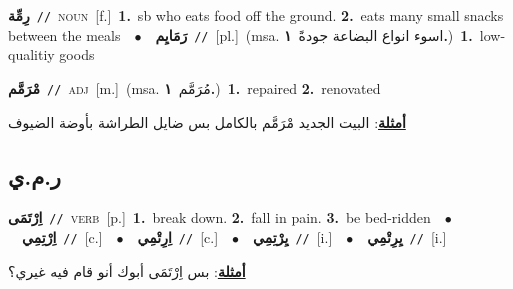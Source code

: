 \documentclass[10pt,a4paper,twoside]{article} %
\begin{document}
\begin{multicols}{2}
{\setlength\topsep{0pt}\textbf{\foreignlanguage{arabic}{رِمِّة}}\ {\color{gray}\texttt{//}\color{black}}\ \textsc{noun}\ [f.]\ \textbf{1.}~sb who eats food off the ground.  \textbf{2.}~eats many small snacks between the meals\ \ $\bullet$\ \ \setlength\topsep{0pt}\textbf{\foreignlanguage{arabic}{رَمَايِم}}\ {\color{gray}\texttt{//}\color{black}}\ [pl.]\ \color{gray}(msa. \foreignlanguage{arabic}{اسوء انواع البضاعة جودةً}~\foreignlanguage{arabic}{\textbf{١.}})\color{black}\ \textbf{1.}~low-qualitiy goods\ } \vspace{2mm}

{\setlength\topsep{0pt}\textbf{\foreignlanguage{arabic}{مْرَمَّم}}\ {\color{gray}\texttt{//}\color{black}}\ \textsc{adj}\ [m.]\ \color{gray}(msa. \foreignlanguage{arabic}{مُرَمَّم}~\foreignlanguage{arabic}{\textbf{١.}})\color{black}\ \textbf{1.}~repaired  \textbf{2.}~renovated\  \begin{flushright}\color{gray}\foreignlanguage{arabic}{\textbf{\underline{\foreignlanguage{arabic}{أمثلة}}}: البيت الجديد مْرَمَّم بالكامل بس ضايل الطراشة بأوضة الضيوف}\end{flushright}\color{black}} \vspace{2mm}

\vspace{-3mm}
\subsection*{\color{blue}\foreignlanguage{arabic}{ر.م.ي}\color{blue}{}} 

{\setlength\topsep{0pt}\textbf{\foreignlanguage{arabic}{اِرْتَمَى}}\ {\color{gray}\texttt{//}\color{black}}\ \textsc{verb}\ [p.]\ \textbf{1.}~break down.  \textbf{2.}~fall in pain.  \textbf{3.}~be bed-ridden\ \ $\bullet$\ \ \setlength\topsep{0pt}\textbf{\foreignlanguage{arabic}{اِرْتِمِي}}\ {\color{gray}\texttt{//}\color{black}}\ [c.]\ \ $\bullet$\ \ \setlength\topsep{0pt}\textbf{\foreignlanguage{arabic}{اِرِتْمِي}}\ {\color{gray}\texttt{//}\color{black}}\ [c.]\ \ $\bullet$\ \ \setlength\topsep{0pt}\textbf{\foreignlanguage{arabic}{يِرْتِمِي}}\ {\color{gray}\texttt{//}\color{black}}\ [i.]\ \ $\bullet$\ \ \setlength\topsep{0pt}\textbf{\foreignlanguage{arabic}{يِرِتْمِي}}\ {\color{gray}\texttt{//}\color{black}}\ [i.]\  \begin{flushright}\color{gray}\foreignlanguage{arabic}{\textbf{\underline{\foreignlanguage{arabic}{أمثلة}}}: بس اِرْتَمَى أبوك أنو قام فيه غيري؟}\end{flushright}\color{black}} \vspace{2mm}


\end{multicols}
\end{document}

